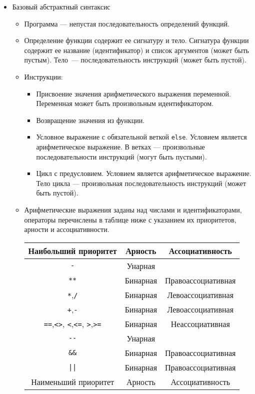 \documentclass[12pt]{article}
\begin{document}
\begin{itemize}
\begin{itemize}
  \end{itemize}
  \item Базовый абстрактный синтаксис
  \begin{itemize}
    \item Программа --- непустая последовательность определений функций.
    \item Определение функции содержит ее сигнатуру и тело. Сигнатура функции содержит ее название (идентификатор) и список аргументов (может быть пустым). Тело~--- последовательность инструкций (может быть пустой).
    \item Инструкции:
    \begin{itemize}
      \item Присвоение значения арифметического выражения переменной. Переменная может быть произвольным идентификатором.
      \item Возвращение значения из функции.
      \item Условное выражение с обязательной веткой \verb!else!. Условием является арифметическое выражение. В ветках --- произвольные последовательности инструкций (могут быть пустыми).
      \item Цикл с предусловием. Условием является арифметическое выражение. Тело цикла --- произвольная последовательность инструкций (может быть пустой).
    \end{itemize}
    \item Арифметические выражения заданы над числами и идентификаторами, операторы перечислены в таблице ниже с указанием их приоритетов, арности и ассоциативности.

    \begin{center}
      \begin{tabular}{ c | c | c }
        Наибольший приоритет & Арность & Ассоциативность  \\ \hline \hline
        \verb!-! & Унарная & \\
        \verb!**! & Бинарная &Правоассоциативная \\
       \verb!*!,\verb!/! & Бинарная & Левоассоциативная \\
       \verb!+!,\verb!-! & Бинарная & Левоассоциативная \\
       \verb!==!,\verb!<>!, \verb!<!,\verb!<=!, \verb!>!,\verb!>=! & Бинарная & Неассоциативная \\
       \verb!--! & Унарная &  \\

       \verb!&&! & Бинарная & Правоассоциативная \\
       \verb!||! & Бинарная & Правоассоциативная \\
       \hline \hline
       Наименьший приоритет & Арность & Ассоциативность
      \end{tabular}
      \end{center}
  \end{itemize}
\end{itemize}

\bigskip


\end{document}
